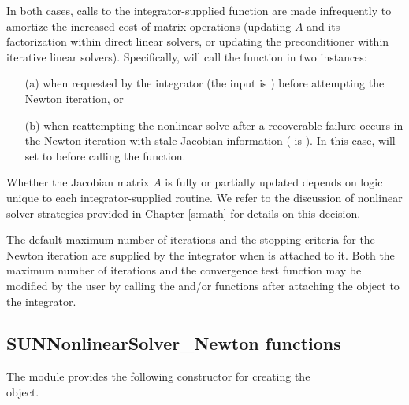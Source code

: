 In both cases, calls to the integrator-supplied 
function are made infrequently to amortize the increased cost of
matrix operations (updating $A$ and its factorization within direct
linear solvers, or updating the preconditioner within iterative linear
solvers).  Specifically, {\sunnonlinsolnewton} will call the
 function in two instances:
\begin{itemize}
\item[(a)] when requested by the integrator (the input
   is ) before attempting the Newton
  iteration, or
\item[(b)] when reattempting the nonlinear solve after a recoverable
  failure occurs in the Newton iteration with stale Jacobian
  information ( is ).  In this case,
  {\sunnonlinsolnewton} will set  to  before
  calling the  function.
\end{itemize}
Whether the Jacobian matrix $A$ is fully or partially updated depends
on logic unique to each integrator-supplied 
routine. We refer to the discussion of nonlinear solver strategies
provided in Chapter \ref{s:math} for details on this decision.

The default maximum number of iterations and the stopping criteria for
the Newton iteration are supplied by the {\sundials} integrator when
{\sunnonlinsolnewton} is attached to it.  Both the maximum number of
iterations and the convergence test function may be modified by the
user by calling the  and/or
 functions after attaching the
{\sunnonlinsolnewton} object to the integrator.

\subsection{SUNNonlinearSolver\_Newton functions}
\label{ss:sunnonlinsolnewton_functions}

The {\sunnonlinsolnewton} module provides the following constructor
for creating the \\ \noindent
{} object.

